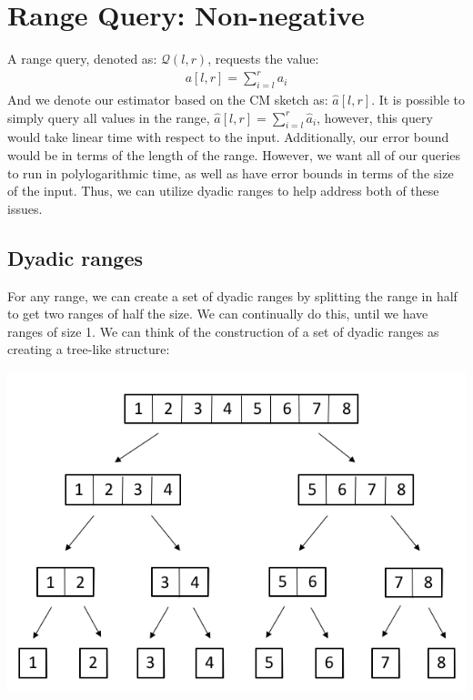 \documentclass[11pt]{article}
\begin{document}
{\section{Range Query: Non-negative}
A range query, denoted as: $\mathcal{Q}(l,r)$, requests the value:
\begin{align*}
    a[l,r] = \sum_{i=l}^r a_i
\end{align*}
And we denote our estimator based on the CM sketch as: $\hat a[l,r]$. It is possible to simply query all values in the range, $\hat a[l,r] = \sum_{i=l}^r \hat a_i$, however, this query would take linear time with respect to the input. Additionally, our error bound would be in terms of the length of the range. However, we want all of our queries to run in polylogarithmic time, as well as have error bounds in terms of the size of the input. Thus, we can utilize dyadic ranges to help address both of these issues.
\subsection{Dyadic ranges}
For any range, we can create a set of dyadic ranges by splitting the range in half to get two ranges of half the size. We can continually do this, until we have ranges of size 1. We can think of the construction of a set of dyadic ranges as creating a tree-like structure:
\begin{center}\includegraphics[scale=0.3]{dyadic_ranges.png}\end{center}
}
\end{document}
